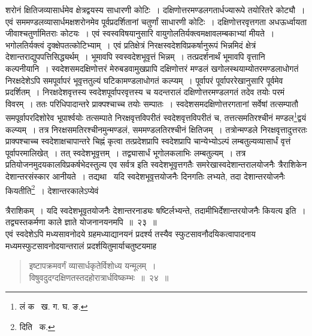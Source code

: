 \documentclass[11pt, openany]{book}
\begin{document}
\newpage

\noindent शरोनं क्षितिजव्यासार्धमेव क्षेत्रद्वयस्य साधारणी कोटिः~। दक्षिणोत्तरमण्डलगतार्धज्यारूपे तयोरितरे कोट्यौ~। एवं 
सममण्डलव्यासार्धमक्षशरोनमेव पूर्वप्रदर्शितानां चतुर्णां साधारणी कोटिः~। दक्षिणोत्तरवृत्तगता अधऊर्ध्वायता जीवाश्चतुर्णामितराः कोटयः~। एवं स्वस्वविषयानुसारि वायुगोलतिर्यक्त्वमक्षावलम्बकाभ्यां मीयते~। भगोलतिर्यक्त्वं दृक्क्षेपतत्कोटिभ्याम्~। एवं प्रतिक्षेत्रं 
निरक्षस्वदेशविप्रकर्षानुरूपं भिन्नमिदं क्षेत्रं देशान्तराद्युपपत्तिसिद्ध्यर्थम्~। भूमावपि स्वस्वदेशभूवृत्तं भिन्नम्~। तत्प्रदर्शनार्थं भूमावपि वृत्तानि कल्पनीयानि~। स्वदेशसमदक्षिणोत्तरं मेरुबडवामुखप्रापि दक्षिणोत्तरं मण्डलं खगोलस्थयाम्योतरमण्डलाधोगतं निरक्षदेशेऽपि समपूर्वापरं 
भूवृत्ततुल्यं घटिकामण्डलाधोगतं कल्प्यम्~। पूर्वापरं पूर्वापररेखानुसारि पूर्वमेव प्रदर्शितम्~। निरक्षदेशवृत्तस्य स्वदेशपूर्वापरवृत्तस्य च यदन्तरालं दक्षिणोत्तरमण्डलगतं तदेव तयोः परमं विवरम्~। ततः परिधिपादान्तरे प्राक्पश्चाच्च तयोः सम्पातः~। स्वदेशसमदक्षिणोत्तरगतानां सर्वेषां तत्सम्पातौ समपूर्वापरदिशोरेव भूपार्श्वयोः तत्सम्पाते निरक्षवृत्तविपरीतं स्वदेशवृत्तविपरीतं च, तत्तत्समतिरश्चीनं मण्डल\renewcommand{\thefootnote}{१}\footnote{लं क \textendash\ ख. ग. घ. ङ.}द्वयं कल्प्यम्~। तत्र निरक्षसमतिरश्चीनमुन्मण्डलं, सममण्डलतिरश्चीनं क्षितिजम्~। तत्रोन्मण्डले निरक्षवृत्तादुत्तरतः प्राक्पश्चाच्च स्वदेशाक्षचापान्तरे चिह्नं कृत्वा तत्प्रदेशप्रापि स्वदेशप्रापि चान्येभ्योऽल्पं लम्बतुल्यव्यासार्धं वृत्तं पूर्वापरमालिखेत्~। तत् स्वदेशभूवृत्तम्~। तद्व्यासार्धं भूगोलकलाभिः लम्बतुल्यम्~। तत्र प्रतियोजनमुदयकालविप्रकर्षभेदस्तुल्य एव सर्वत्र इति स्वदेशभूवृत्तगतैः समरेखास्वदेशान्तरालयोजनैः त्रैराशिकेन 
देशान्तरसंस्कार आनीयते~। तद्यथा \textendash\ यदि स्वदेशभूवृत्तयोजनैः दिनगतिः लभ्यते, तदा देशान्तरयोजनैः कियतीति\renewcommand{\thefootnote}{२}\footnote{दिति \textendash\ क.}~। देशान्तरकालेऽप्येवं 

\newpage

\noindent त्रैराशिकम्~। यदि स्वदेशभूवृतयोजनैः देशान्तरनाड्यः षष्टिर्लभ्यन्ते, तदामीभिर्देशान्तरयोजनैः कियत्य इति~। तद्व्यस्तकर्मणा काले ज्ञाते योजनानयनमपि~॥~२३~॥ \\

\indent एवं स्वदेशेऽपि मध्यसावनोदये ग्रहमध्याद्यानयनं प्रदर्श्य तस्यैव स्फुटसावनौदयिकत्वापादनाय मध्यमस्फुटसावनोदयान्तरालं प्रदर्शयितुमार्याचतुष्टयमाह\textendash  

\begin{quote}
{\ab इष्टापक्रमवर्गं व्यासार्धकृतेर्विशोध्य यन्मूलम्~। \\
 विषुवदुदग्दक्षिणतस्तदहोरात्रार्धविष्कम्भः~॥~२४~॥} 
\end{quote}
 
\end{document}
